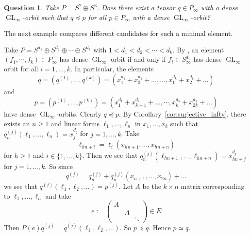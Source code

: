 \documentclass{amsart}
\theoremstyle{plain}
\newtheorem{que}[thm]{Question}
\theoremstyle{definition}
\DeclareMathOperator{\GL}{GL}
\begin{document}
\begin{que}
Take $P=S^2 \oplus S^3$. Does there exist a tensor $q\in P_{\infty}$ with a dense $\GL_{\infty}$-orbit such that $q\preceq p$ for all $p\in P_{\infty}$ with a dense $\GL_{\infty}$-orbit?
\end{que}

The next example compares different candidates for such a minimal element.

\begin{ex}
Take $P = S^{d_1} \oplus S^{d_2} \oplus \cdots \oplus S^{d_k}$ with $1<d_1<d_2<\cdots<d_k$.
By \cite[Lemma 4.5.3]{B:thesis}, an element $(f_1, \cdots, f_k)\in P_{\infty}$ has dense $\GL_\infty$-orbit if and only if $f_i \in S^{d_i}_{\infty}$ has dense $\GL_\infty$-orbit for all $i = 1, \ldots, k$. In particular, the elements
\[
q =(q^{(1)},\ldots,q^{(k)})= (x_1^{d_1} + x_2^{d_1} + \ldots, \ldots, x_1^{d_k} + x_2^{d_k} + \ldots)
\]
and
\[
p=(p^{(1)},\ldots,p^{(k)})= (x_1^{d_1} + x_{k+1}^{d_1} + \ldots, \cdots, x_k^{d_k} + x_{2k}^{d_k} + \ldots)
\]
have dense $\GL_\infty$-orbits. Clearly $q\preceq p$. By Corollary~\ref{cor:surjective_infty}, there exists an $n\geq 1$ and linear forms $\ell_1,\ldots,\ell_n$ in $x_1,\ldots,x_k$ such that $q_n^{(j)}(\ell_1,\ldots,\ell_n)= x_j^{d_j}$ for $j=1,\ldots,k$. Take
\[
\ell_{hn+i}=\ell_i(x_{hn+1},\ldots,x_{hn+n})
\]
for $h\geq 1$ and $i\in\{1,\ldots,k\}$. Then we see that $q_n^{(j)}(\ell_{hn+1},\ldots,\ell_{hn+n})= x_{hn+j}^{d_j}$ for $j=1,\ldots,k$. So since
\[
q^{(j)}=q_n^{(j)}+q_n^{(j)}(x_{n+1},\ldots,x_{2n})+\ldots
\]
we see that $q^{(j)}(\ell_1,\ell_2,\ldots)=p^{(j)}$. Let $A$ be the $k\times n$ matrix corresponding to $\ell_1,\ldots,\ell_n$ and take
\[
e:=\begin{pmatrix}A\\&A\\&&\ddots\end{pmatrix}\in E
\]
Then $P(e)q^{(j)}=q^{(j)}(\ell_1,\ell_2,\ldots)$. So $p\preceq q$. Hence $p\simeq q$.
\end{ex}
\end{document}

